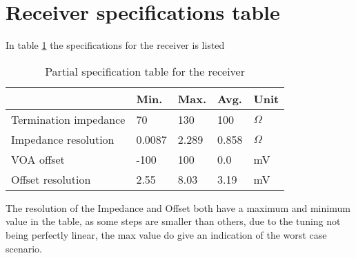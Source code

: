 \section{Receiver specifications table }

In table \ref{tab:specifications} the specifications for the receiver is listed


\begin{table}[H]
  \centering
  \begin{tabular}{l|l|l|l|l}
    & Min. & Max. & Avg. & Unit \\
    \hline
	Termination impedance & 70 & 130 & 100 & $\Omega$\\
	Impedance resolution & 0.0087 & 2.289 & 0.858 & $\Omega$\\
	VOA offset & -100 & 100 & 0.0 & mV\\
	Offset resolution & 2.55 & 8.03 & 3.19 & mV\\
  \end{tabular}
  \caption{Partial specification table for the receiver}
  \label{tab:specifications}
\end{table}

The resolution of the Impedance and Offset both have a maximum and minimum value in the table, as some steps are smaller than others, due to the tuning not being perfectly linear, the max value do give an indication of the worst case scenario.

